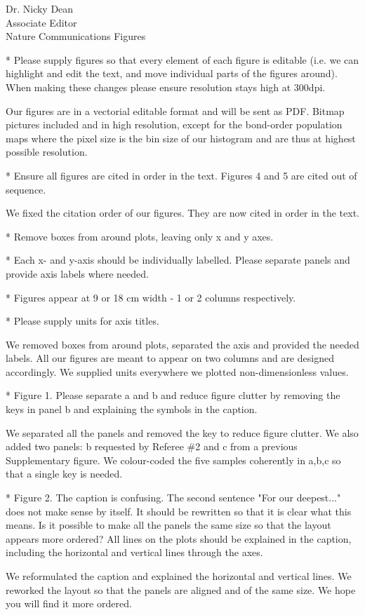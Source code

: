 \documentclass[a4paper, rebuttal, parskip=true, firsthead=false, fromemail=true, foldmarks=false]{scrlttr2}
\begin{document}
\begin{letter}{Dr. Nicky Dean\\
Associate Editor\\
Nature Communications}
\textsf{Figures}
\begin{quotationi}
* Please supply figures so that every element of each figure is editable (i.e. we can highlight and edit the text, and move individual parts of the figures around). When making these changes please ensure resolution stays high at 300dpi.
\end{quotationi}

Our figures are in a vectorial editable format and will be sent as PDF. Bitmap pictures included and in high resolution, except for the bond-order population maps where the pixel size is the bin size of our histogram and are thus at highest possible resolution.

\begin{quotationi}
* Ensure all figures are cited in order in the text. Figures 4 and 5 are cited out of sequence.
\end{quotationi}
We fixed the citation order of our figures. They are now cited in order in the text.

\begin{quotationi}
* Remove boxes from around plots, leaving only x and y axes.

* Each x- and y-axis should be individually labelled. Please separate panels and provide axis labels where needed.

* Figures appear at 9 or 18 cm width - 1 or 2 columns respectively.

* Please supply units for axis titles.
\end{quotationi}
We removed boxes from around plots, separated the axis and provided the needed labels. All our figures are meant to appear on two columns and are designed accordingly. We supplied units everywhere we plotted non-dimensionless values.

\begin{quotationi}
* Figure 1. Please separate a and b and reduce figure clutter by removing the keys in panel b and explaining the symbols in the caption.
\end{quotationi}
We separated all the panels and removed the key to reduce figure clutter. We also added two panels: b requested by Referee \#2 and c from a previous Supplementary figure. We colour-coded the five samples coherently in a,b,c so that a single key is needed.

\begin{quotationi}
* Figure 2. The caption is confusing. The second sentence "For our deepest..." does not make sense by itself. It should be rewritten so that it is clear what this means. Is it possible to make all the panels the same size so that the layout appears more ordered? All lines on the plots should be explained in the caption, including the horizontal and vertical lines through the axes.
\end{quotationi}
We reformulated the caption and explained the horizontal and vertical lines. We reworked the layout so that the panels are aligned and of the same size. We hope you will find it more ordered.


\end{letter}
\end{document}
